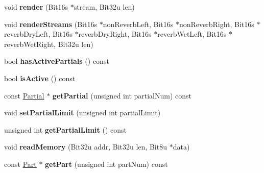 \begin{DoxyCompactItemize}
\item 
\hypertarget{classMT32Emu_1_1Synth_aacfb514fc017b0345fda64604e789ee3}{void {\bfseries render} (Bit16s $\ast$stream, Bit32u len)}\label{classMT32Emu_1_1Synth_aacfb514fc017b0345fda64604e789ee3}

\item 
\hypertarget{classMT32Emu_1_1Synth_a7fb364b4ed786c936ed1f32d5b288686}{void {\bfseries render\-Streams} (Bit16s $\ast$non\-Reverb\-Left, Bit16s $\ast$non\-Reverb\-Right, Bit16s $\ast$reverb\-Dry\-Left, Bit16s $\ast$reverb\-Dry\-Right, Bit16s $\ast$reverb\-Wet\-Left, Bit16s $\ast$reverb\-Wet\-Right, Bit32u len)}\label{classMT32Emu_1_1Synth_a7fb364b4ed786c936ed1f32d5b288686}

\item 
\hypertarget{classMT32Emu_1_1Synth_aa15be06933c2f0cdc5cbe024cd4ac103}{bool {\bfseries has\-Active\-Partials} () const }\label{classMT32Emu_1_1Synth_aa15be06933c2f0cdc5cbe024cd4ac103}

\item 
\hypertarget{classMT32Emu_1_1Synth_a64e851964873f6563c4f72b392de18c2}{bool {\bfseries is\-Active} () const }\label{classMT32Emu_1_1Synth_a64e851964873f6563c4f72b392de18c2}

\item 
\hypertarget{classMT32Emu_1_1Synth_a3918ce533d2b22381daa3fce0e533e67}{const \hyperlink{classMT32Emu_1_1Partial}{Partial} $\ast$ {\bfseries get\-Partial} (unsigned int partial\-Num) const }\label{classMT32Emu_1_1Synth_a3918ce533d2b22381daa3fce0e533e67}

\item 
\hypertarget{classMT32Emu_1_1Synth_a2f629ad08ed00fdc79f113142932152a}{void {\bfseries set\-Partial\-Limit} (unsigned int partial\-Limit)}\label{classMT32Emu_1_1Synth_a2f629ad08ed00fdc79f113142932152a}

\item 
\hypertarget{classMT32Emu_1_1Synth_a373baaf76666fb03ab35c80c45de9031}{unsigned int {\bfseries get\-Partial\-Limit} () const }\label{classMT32Emu_1_1Synth_a373baaf76666fb03ab35c80c45de9031}

\item 
\hypertarget{classMT32Emu_1_1Synth_a05967518ce744420fa83491a630007c8}{void {\bfseries read\-Memory} (Bit32u addr, Bit32u len, Bit8u $\ast$data)}\label{classMT32Emu_1_1Synth_a05967518ce744420fa83491a630007c8}

\item 
\hypertarget{classMT32Emu_1_1Synth_a0eb07100db7746a7eb2393e12147db98}{const \hyperlink{classMT32Emu_1_1Part}{Part} $\ast$ {\bfseries get\-Part} (unsigned int part\-Num) const }\label{classMT32Emu_1_1Synth_a0eb07100db7746a7eb2393e12147db98}


\end{DoxyCompactItemize}
